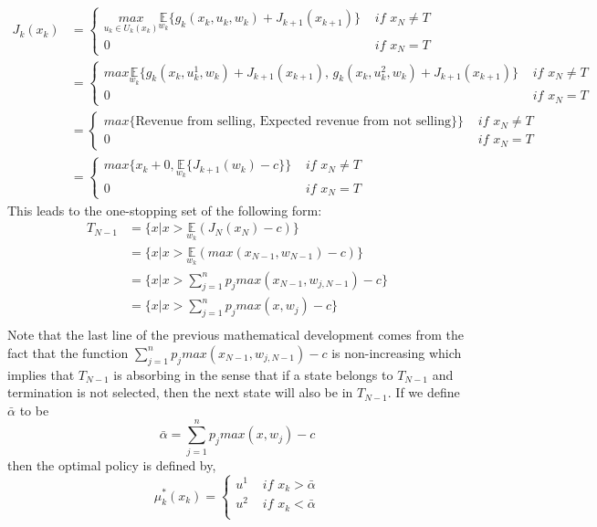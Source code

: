 \documentclass[11pt, oneside]{article}   	%
\begin{document}
\begin{align*}
J_{k}(x_{k}) &=
\begin{cases}
				\underset{u_{k} \in U_{k}(x_{k})}{max} \underset{w_{k}}{\mathbb{E}} \big\{g_{k}(x_{k},u_{k},w_{k}) + J_{k+1}(x_{k+1})\big\} \, \, & if \, \, x_{N} \neq T\\
				0 \, \,  & if \, \, x_{N} = T
			   \end{cases}\\
			   &=
\begin{cases}
				max \underset{w_{k}}{\mathbb{E}} \big\{g_{k}(x_{k},u_{k}^{1},w_{k}) + J_{k+1}(x_{k+1}), \, g_{k}(x_{k},u_{k}^{2},w_{k}) + J_{k+1}(x_{k+1})\big\} \, \, & if \, \, x_{N} \neq T\\
				0 \, \,  & if \, \, x_{N} = T
			   \end{cases}\\
			   &=
\begin{cases}
				max\big\{\text{Revenue from selling, Expected revenue from not selling}\}\big\} \, \, & if \, \, x_{N} \neq T\\
				0 \, \,  & if \, \, x_{N} = T
			   \end{cases}\\
			   &=
			   \begin{cases}
				max\big\{x_{k} + 0,\underset{w_{k}}{\mathbb{E}}\{J_{k+1}(w_{k})-c\}\big\} \, \, & if \, \, x_{N} \neq T\\
				0 \, \,  & if \, \, x_{N} = T
			   \end{cases}
\end{align*}
This leads to the one-stopping set of the following form:
\begin{align*}
T_{N-1} &= \big\{x | x > \underset{w_{k}}{\mathbb{E}} (J_{N}(x_{N}) - c)\big\}\\
&= \big\{x | x > \underset{w_{k}}{\mathbb{E}} (max(x_{N-1},w_{N-1}) - c)\big\}\\
&= \big\{x | x >  \sum_{j=1}^{n} p_{j} max(x_{N-1},w_{j,N-1}) - c\big\}\\
&= \big\{x | x >  \sum_{j=1}^{n} p_{j} max(x,w_{j}) - c\big\}\\
\end{align*}
Note that the last line of the previous mathematical development comes from the fact that the function $\sum_{j=1}^{n} p_{j} max(x_{N-1},w_{j,N-1}) - c$ is non-increasing which implies that $T_{N-1}$ is absorbing in the sense that if a state belongs to $T_{N-1}$ and termination is not selected, then the next state will also be in $T_{N-1}$. If we define $\bar{\alpha}$ to be
$$\bar{\alpha} = \sum_{j=1}^{n} p_{j} max(x,w_{j}) - c$$
then the optimal policy is defined by,
$$\mu_{k}^{*}(x_{k}) = \begin{cases}
				u^{1} \, \, & if \, \, x_{k} > \bar{\alpha}\\
				u^{2} \, \, & if \, \, x_{k} < \bar{\alpha}\\
			   \end{cases}
$$
\end{document}
